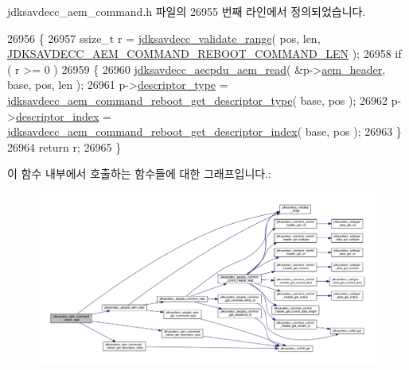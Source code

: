 jdksavdecc\+\_\+aem\+\_\+command.\+h 파일의 26955 번째 라인에서 정의되었습니다.


\begin{DoxyCode}
26956 \{
26957     ssize\_t r = \hyperlink{group__util_ga9c02bdfe76c69163647c3196db7a73a1}{jdksavdecc\_validate\_range}( pos, len, 
      \hyperlink{group__command__reboot_gaf5f6dbe8949b2bb7db6ad9e25e8bddf1}{JDKSAVDECC\_AEM\_COMMAND\_REBOOT\_COMMAND\_LEN} );
26958     \textcolor{keywordflow}{if} ( r >= 0 )
26959     \{
26960         \hyperlink{group__aecpdu__aem_gae2421015dcdce745b4f03832e12b4fb6}{jdksavdecc\_aecpdu\_aem\_read}( &p->\hyperlink{structjdksavdecc__aem__command__reboot_ae1e77ccb75ff5021ad923221eab38294}{aem\_header}, base, pos, len );
26961         p->\hyperlink{structjdksavdecc__aem__command__reboot_ab7c32b6c7131c13d4ea3b7ee2f09b78d}{descriptor\_type} = 
      \hyperlink{group__command__reboot_ga93d390a9dc9aac8dcacf02e949615f6c}{jdksavdecc\_aem\_command\_reboot\_get\_descriptor\_type}( base, 
      pos );
26962         p->\hyperlink{structjdksavdecc__aem__command__reboot_a042bbc76d835b82d27c1932431ee38d4}{descriptor\_index} = 
      \hyperlink{group__command__reboot_ga05a4d0c0bcd7bf1c9ffcfad1b9009302}{jdksavdecc\_aem\_command\_reboot\_get\_descriptor\_index}( base,
       pos );
26963     \}
26964     \textcolor{keywordflow}{return} r;
26965 \}
\end{DoxyCode}


이 함수 내부에서 호출하는 함수들에 대한 그래프입니다.\+:
\nopagebreak
\begin{figure}[H]
\begin{center}
\leavevmode
\includegraphics[width=350pt]{group__command__reboot_ga60ace41ee463cb2628cba17612c1b5c1_cgraph}
\end{center}
\end{figure}


